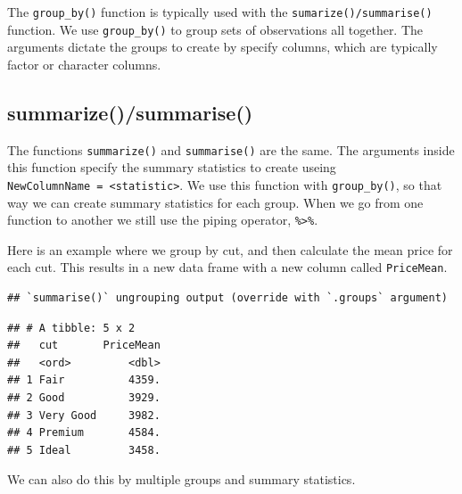 \documentclass[
]{book}
\newenvironment{Shaded}{\begin{snugshade}}{\end{snugshade}}
\newcommand{\DataTypeTok}[1]{\textcolor[rgb]{0.13,0.29,0.53}{#1}}
\newcommand{\KeywordTok}[1]{\textcolor[rgb]{0.13,0.29,0.53}{\textbf{#1}}}
\newcommand{\NormalTok}[1]{#1}
\newcommand{\OperatorTok}[1]{\textcolor[rgb]{0.81,0.36,0.00}{\textbf{#1}}}
\newcommand{\StringTok}[1]{\textcolor[rgb]{0.31,0.60,0.02}{#1}}
\begin{document}
The \texttt{group\_by()} function is typically used with the \texttt{sumarize()/summarise()} function. We use \texttt{group\_by()} to group sets of observations all together. The arguments dictate the groups to create by specify columns, which are typically factor or character columns.

\hypertarget{summarizesummarise}{%
\subsection{summarize()/summarise()}\label{summarizesummarise}}

The functions \texttt{summarize()} and \texttt{summarise()} are the same. The arguments inside this function specify the summary statistics to create useing \texttt{NewColumnName\ =\ \textless{}statistic\textgreater{}}. We use this function with \texttt{group\_by()}, so that way we can create summary statistics for each group. When we go from one function to another we still use the piping operator, \texttt{\%\textgreater{}\%}.

Here is an example where we group by cut, and then calculate the mean price for each cut. This results in a new data frame with a new column called \texttt{PriceMean}.

\begin{Shaded}
\end{Shaded}

\begin{verbatim}
## `summarise()` ungrouping output (override with `.groups` argument)
\end{verbatim}

\begin{verbatim}
## # A tibble: 5 x 2
##   cut       PriceMean
##   <ord>         <dbl>
## 1 Fair          4359.
## 2 Good          3929.
## 3 Very Good     3982.
## 4 Premium       4584.
## 5 Ideal         3458.
\end{verbatim}

We can also do this by multiple groups and summary statistics.

\begin{Shaded}
\end{Shaded}
\end{document}
